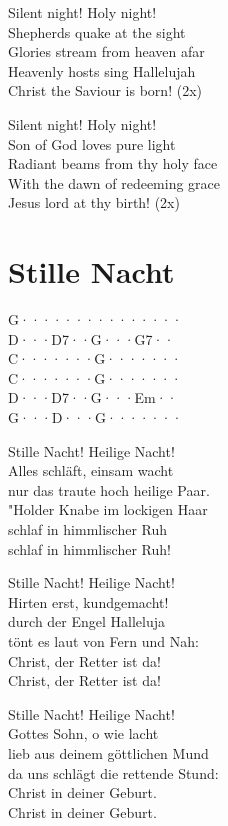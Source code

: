 \documentclass[
  letterpaper,
  a5paper]{memoir}
\begin{document}
Silent night! Holy night!\\
Shepherds quake at the sight\\
Glories stream from heaven afar\\
Heavenly hosts sing Hallelujah\\
Christ the Saviour is born! (2x)

Silent night! Holy night!\\
Son of God love\textquotesingle s pure light\\
Radiant beams from thy holy face\\
With the dawn of redeeming grace\\
Jesus lord at thy birth! (2x)

\hypertarget{stille-nacht}{%
\chapter{Stille Nacht}\label{stille-nacht}}

G···\textbar····\textbar····\textbar····\textbar{}\\
D···\textbar D7··\textbar G···\textbar G7··\textbar{}\\
C···\textbar····\textbar G···\textbar····\textbar{}\\
C···\textbar····\textbar G···\textbar····\textbar{}\\
D···\textbar D7··\textbar G···\textbar Em··\textbar{}\\
G···\textbar D···\textbar G···\textbar····\textbar{}

Stille Nacht! Heilige Nacht!\\
Alles schläft, einsam wacht\\
nur das traute hoch heilige Paar.\\
"Holder Knabe im lockigen Haar\\
schlaf in himmlischer Ruh\textquotesingle{}\\
schlaf in himmlischer Ruh\textquotesingle!

Stille Nacht! Heilige Nacht!\\
Hirten erst, kundgemacht!\\
durch der Engel Halleluja\\
tönt es laut von Fern\textquotesingle{} und Nah:\\
Christ, der Retter ist da!\\
Christ, der Retter ist da!

Stille Nacht! Heilige Nacht!\\
Gottes Sohn, o wie lacht\\
lieb\textquotesingle{} aus deinem göttlichen Mund\\
da uns schlägt die rettende Stund\textquotesingle:\\
Christ in deiner Geburt.\\
Christ in deiner Geburt.
\end{document}
